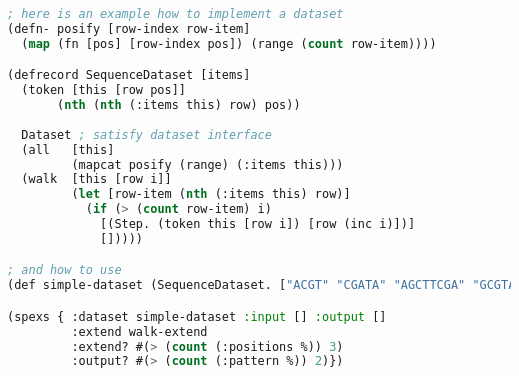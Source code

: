 \begin{lstlisting}[language=Lisp]
; here is an example how to implement a dataset
(defn- posify [row-index row-item]
  (map (fn [pos] [row-index pos]) (range (count row-item))))

(defrecord SequenceDataset [items]
  (token [this [row pos]] 
       (nth (nth (:items this) row) pos))
  
  Dataset ; satisfy dataset interface
  (all   [this]
         (mapcat posify (range) (:items this)))
  (walk  [this [row i]] 
         (let [row-item (nth (:items this) row)]
           (if (> (count row-item) i)
             [(Step. (token this [row i]) [row (inc i)])]
             []))))

; and how to use
(def simple-dataset (SequenceDataset. ["ACGT" "CGATA" "AGCTTCGA" "GCGTAA"]))

(spexs { :dataset simple-dataset :input [] :output []
         :extend walk-extend
         :extend? #(> (count (:positions %)) 3)
         :output? #(> (count (:pattern %)) 2)})
\end{lstlisting}


